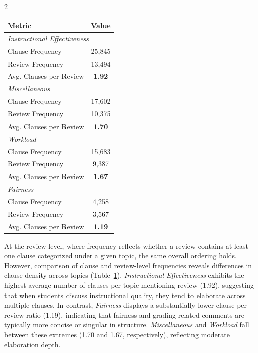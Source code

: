 \documentclass{article}
\begin{document}
\begin{multicols*}{2}
\begin{table}[H]
\centering
{}
\label{tab:clause_review_freq}
\begin{tabular}{l c}
\toprule
\textbf{Metric} & \textbf{Value} \\
\midrule
\multicolumn{2}{l}{\textit{Instructional Effectiveness}} \\
Clause Frequency & 25,845 \\
Review Frequency & 13,494 \\
Avg. Clauses per Review & \textbf{1.92} \\
\midrule
\multicolumn{2}{l}{\textit{Miscellaneous}} \\
Clause Frequency & 17,602 \\
Review Frequency & 10,375 \\
Avg. Clauses per Review & \textbf{1.70} \\
\midrule
\multicolumn{2}{l}{\textit{Workload}} \\
Clause Frequency & 15,683 \\
Review Frequency & 9,387 \\
Avg. Clauses per Review & \textbf{1.67} \\
\midrule
\multicolumn{2}{l}{\textit{Fairness}} \\
Clause Frequency & 4,258 \\
Review Frequency & 3,567 \\
Avg. Clauses per Review & \textbf{1.19} \\
\bottomrule
\end{tabular}
\end{table}

At the review level, where frequency reflects whether a review contains at least one clause categorized under a given topic, the same overall ordering holds. However, comparison of clause and review-level frequencies reveals differences in clause density across topics (Table~\ref{tab:clause_review_freq}). \textit{Instructional Effectiveness} exhibits the highest average number of clauses per topic-mentioning review (1.92), suggesting that when students discuss instructional quality, they tend to elaborate across multiple clauses. In contrast, \textit{Fairness} displays a substantially lower clause-per-review ratio (1.19), indicating that fairness and grading-related comments are typically more concise or singular in structure. \textit{Miscellaneous} and \textit{Workload} fall between these extremes (1.70 and 1.67, respectively), reflecting moderate elaboration depth.


\end{multicols*}
\end{document}
